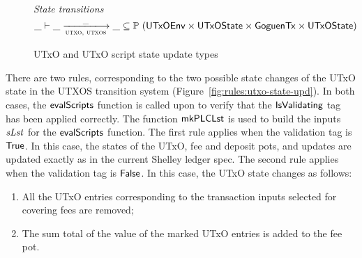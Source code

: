 \begin{figure}[htb]
  \emph{State transitions}
  \begin{equation*}
    \_ \vdash
    \var{\_} \trans{utxo, utxos}{\_} \var{\_}
    \subseteq \powerset (\UTxOEnv \times \UTxOState \times \GoguenTx \times \UTxOState)
  \end{equation*}
  \caption{UTxO and UTxO script state update types}
  \label{fig:ts-types:utxo-scripts}
\end{figure}

There are two rules, corresponding to the two possible state changes of the
UTxO state in the UTXOS transition system (Figure~\ref{fig:rules:utxo-state-upd}).
%
In both cases, the $\mathsf{evalScripts}$ function is called upon to verify that the $\mathsf{IsValidating}$
tag has been applied correctly. The function $\mathsf{mkPLCLst}$ is used to build
the inputs $\mathit{sLst}$ for the $\mathsf{evalScripts}$ function.
%
The first rule
applies when the validation tag is $\mathsf{True}$.
In this case, the states of the UTxO, fee
  and deposit pots, and updates are updated exactly as in the current Shelley
  ledger spec.
%
  The second rule
  applies when the validation tag is $\mathsf{False}$.
  In this case, the UTxO state changes as follows:

  \begin{enumerate}
    \item All the
    UTxO entries corresponding to the transaction inputs selected for covering
    fees are removed;

    \item The sum total of the value of the marked UTxO entries
    is added to the fee pot.
  \end{enumerate}



